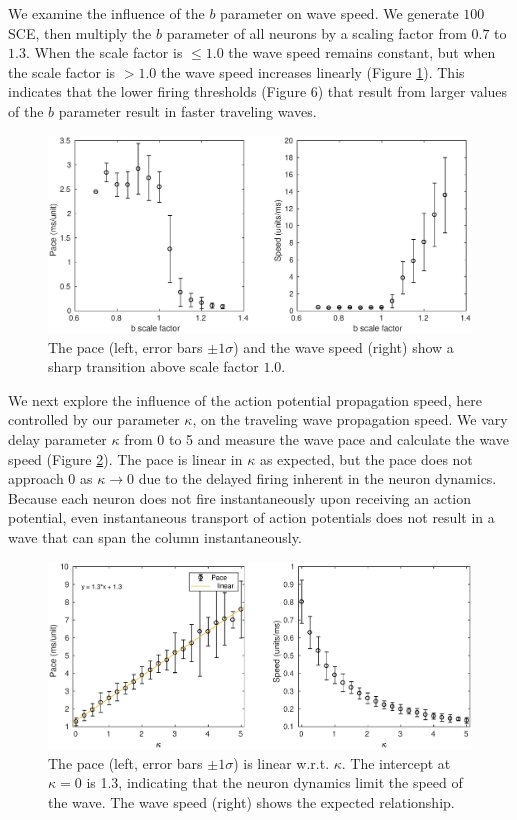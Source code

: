 \documentclass[12pt]{article}
\begin{document}
We examine the influence of the $b$ parameter on wave speed.
We generate $100$ SCE, then multiply the $b$ parameter of all neurons by a scaling factor from $0.7$ to $1.3$.
When the scale factor is $\leq 1.0$ the wave speed remains constant, but when the scale factor is $>1.0$ the wave speed increases linearly (Figure \ref{fig:WaveSpeed_B}).
This indicates that the lower firing thresholds (Figure 6) that result from larger values of the $b$ parameter result in faster traveling waves.

\begin{figure}[!htb]
 \caption{The pace (left, error bars $\pm 1 \sigma$) and the wave speed (right) show a sharp transition above scale factor $1.0$. }
 \label{fig:WaveSpeed_B}
 \centering
   \includegraphics[width=\textwidth]{fig/WaveSpeed_B}
\end{figure}

\FloatBarrier

We next explore the influence of the action potential propagation speed, here controlled by our parameter $\kappa$, on the traveling wave propagation speed.
We vary delay parameter $\kappa$ from 0 to 5 and measure the wave pace and calculate the wave speed (Figure \ref{fig:delay_speed}).
The pace is linear in $\kappa$ as expected, but the pace does not approach $0$ as $\kappa \rightarrow 0$ due to the delayed firing inherent in the neuron dynamics.
Because each neuron does not fire instantaneously upon receiving an action potential, even instantaneous transport of action potentials does not result in a wave that can span the column instantaneously.
\begin{figure}[!htb]
 \caption{The pace (left, error bars $\pm 1 \sigma$) is linear w.r.t. $\kappa$. The intercept at $\kappa=0$ is 1.3, indicating that the neuron dynamics limit the speed of the wave. The wave speed (right) shows the expected relationship. }
 \label{fig:delay_speed}
 \centering
   \includegraphics[width=\textwidth]{fig/WaveSpeed_Delay}
\end{figure}
\FloatBarrier
\end{document}
